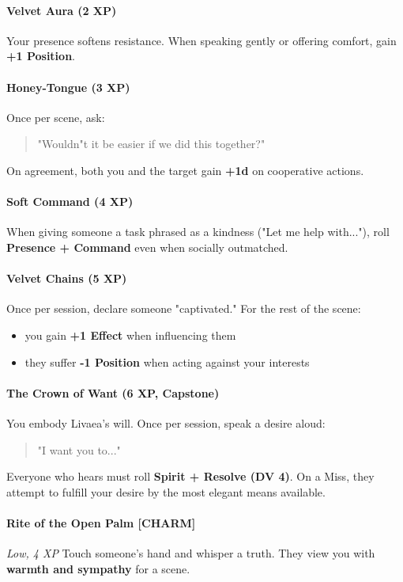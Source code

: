 \documentclass[11pt]{book}
\begin{document}
\paragraph{Velvet Aura (2 XP)}
Your presence softens resistance.  
When speaking gently or offering comfort, gain \textbf{+1 Position}.

\paragraph{Honey-Tongue (3 XP)}
Once per scene, ask:
\begin{quote}
    "Wouldn"t it be easier if we did this together?"
\end{quote}
On agreement, both you and the target gain \textbf{+1d} on cooperative actions.

\paragraph{Soft Command (4 XP)}
When giving someone a task phrased as a kindness ("Let me help with..."),  
roll \textbf{Presence + Command} even when socially outmatched.

\paragraph{Velvet Chains (5 XP)}
Once per session, declare someone "captivated."  
For the rest of the scene:
\begin{itemize}[leftmargin=*]
    \item you gain \textbf{+1 Effect} when influencing them
    \item they suffer \textbf{-1 Position} when acting against your interests
\end{itemize}

\paragraph{The Crown of Want (6 XP, Capstone)}
You embody Livaea's will.  
Once per session, speak a desire aloud:
\begin{quote}
    "I want you to..."
\end{quote}
Everyone who hears must roll \textbf{Spirit + Resolve (DV 4)}.  
On a Miss, they attempt to fulfill your desire by the most elegant means available.

\paragraph{Rite of the Open Palm [CHARM]}
\emph{Low, 4 XP}  
Touch someone's hand and whisper a truth.  
They view you with \textbf{warmth and sympathy} for a scene.
\end{document}
